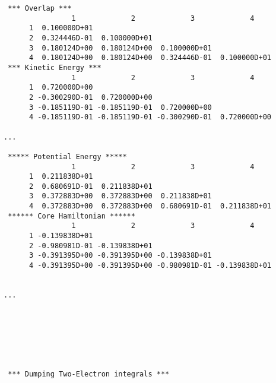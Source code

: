 \begin{verbatim}
 *** Overlap ***
                1             2             3             4
      1  0.100000D+01
      2  0.324446D-01  0.100000D+01
      3  0.180124D+00  0.180124D+00  0.100000D+01
      4  0.180124D+00  0.180124D+00  0.324446D-01  0.100000D+01
 *** Kinetic Energy ***
                1             2             3             4
      1  0.720000D+00
      2 -0.300290D-01  0.720000D+00
      3 -0.185119D-01 -0.185119D-01  0.720000D+00
      4 -0.185119D-01 -0.185119D-01 -0.300290D-01  0.720000D+00

...

 ***** Potential Energy *****
                1             2             3             4
      1  0.211838D+01
      2  0.680691D-01  0.211838D+01
      3  0.372883D+00  0.372883D+00  0.211838D+01
      4  0.372883D+00  0.372883D+00  0.680691D-01  0.211838D+01
 ****** Core Hamiltonian ******
                1             2             3             4
      1 -0.139838D+01
      2 -0.980981D-01 -0.139838D+01
      3 -0.391395D+00 -0.391395D+00 -0.139838D+01
      4 -0.391395D+00 -0.391395D+00 -0.980981D-01 -0.139838D+01


...







 *** Dumping Two-Electron integrals ***




\end{verbatim}
